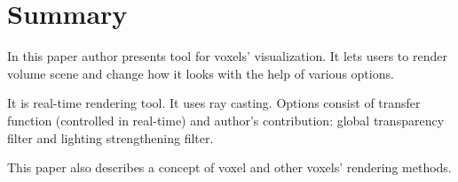 \section{Summary}

In this paper author presents tool for voxels' visualization. It lets users to
render volume scene and change how it looks with the help of various options.

It is real-time rendering tool. It uses ray casting. Options consist of
transfer function (controlled in real-time) and author's contribution: global
transparency filter and lighting strengthening filter.

This paper also describes a concept of voxel and other voxels' rendering
methods.

